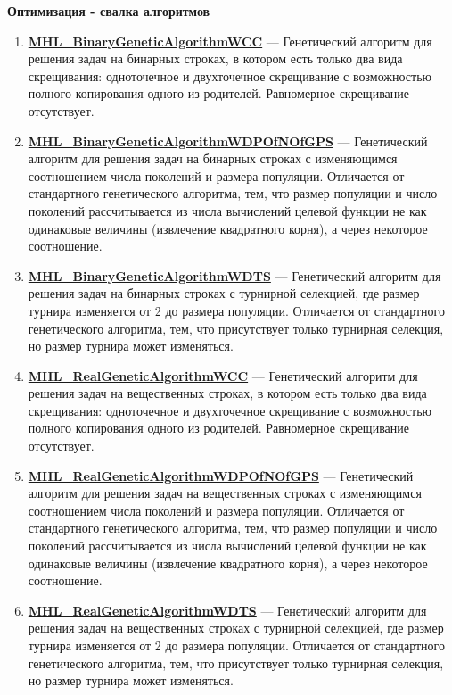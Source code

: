 \documentclass[a4paper,12pt]{article}
\begin{document}
\textbf{Оптимизация - свалка алгоритмов}
\begin{enumerate}

\item \textbf{\hyperref[MHL_BinaryGeneticAlgorithmWCC]{MHL\_BinaryGeneticAlgorithmWCC}} --- Генетический алгоритм для решения задач на бинарных строках, в котором есть только два вида скрещивания: одноточечное и двухточечное скрещивание с возможностью полного копирования одного из родителей. Равномерное скрещивание отсутствует.

\item \textbf{\hyperref[MHL_BinaryGeneticAlgorithmWDPOfNOfGPS]{MHL\_BinaryGeneticAlgorithmWDPOfNOfGPS}} --- Генетический алгоритм для решения задач на бинарных строках с изменяющимся соотношением числа поколений и размера популяции. Отличается от стандартного генетического алгоритма, тем, что размер популяции и число поколений рассчитывается из числа вычислений целевой функции не как одинаковые величины (извлечение квадратного корня), а через некоторое соотношение.

\item \textbf{\hyperref[MHL_BinaryGeneticAlgorithmWDTS]{MHL\_BinaryGeneticAlgorithmWDTS}} --- Генетический алгоритм для решения задач на бинарных строках с турнирной селекцией, где размер турнира изменяется от 2 до размера популяции. Отличается от стандартного генетического алгоритма, тем, что присутствует только турнирная селекция, но размер турнира может изменяться.

\item \textbf{\hyperref[MHL_RealGeneticAlgorithmWCC]{MHL\_RealGeneticAlgorithmWCC}} --- Генетический алгоритм для решения задач на вещественных строках, в котором есть только два вида скрещивания: одноточечное и двухточечное скрещивание с возможностью полного копирования одного из родителей. Равномерное скрещивание отсутствует.

\item \textbf{\hyperref[MHL_RealGeneticAlgorithmWDPOfNOfGPS]{MHL\_RealGeneticAlgorithmWDPOfNOfGPS}} --- Генетический алгоритм для решения задач на вещественных строках с изменяющимся соотношением числа поколений и размера популяции. Отличается от стандартного генетического алгоритма, тем, что размер популяции и число поколений рассчитывается из числа вычислений целевой функции не как одинаковые величины (извлечение квадратного корня), а через некоторое соотношение.

\item \textbf{\hyperref[MHL_RealGeneticAlgorithmWDTS]{MHL\_RealGeneticAlgorithmWDTS}} --- Генетический алгоритм для решения задач на вещественных строках  с турнирной селекцией, где размер турнира изменяется от 2 до размера популяции.
Отличается от стандартного генетического алгоритма, тем, что присутствует только турнирная селекция, но размер турнира может изменяться.

\end{enumerate}
\end{document}
